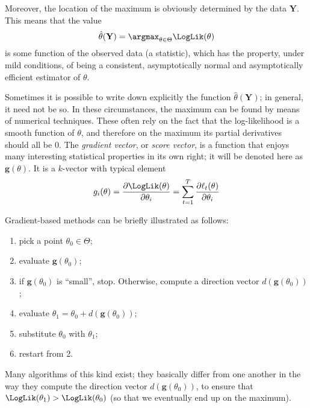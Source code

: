 Moreover, the location of the maximum is obviously determined by the
data $\mathbf{Y}$. This means that the value
\begin{equation}
  \label{eq:maxlik}
  \hat{\theta}(\mathbf{Y}) = \argmax_{\theta \in \Theta} \LogLik(\theta)
\end{equation}
is some function of the observed data (a statistic), which has the
property, under mild conditions, of being a consistent, asymptotically
normal and asymptotically efficient estimator of $\theta$.

Sometimes it is possible to write down explicitly the function
$\hat{\theta}(\mathbf{Y})$; in general, it need not be so. In these
circumstances, the maximum can be found by means of numerical
techniques. These often rely on the fact that the log-likelihood is a
smooth function of $\theta$, and therefore on the maximum its partial
derivatives should all be 0.  The \textsl{gradient vector}, or
\textsl{score vector}, is a function that enjoys many interesting
statistical properties in its own right; it will be denoted here as
$\mathbf{g}(\theta)$.  It is a $k$-vector with typical element
\[
g_i(\theta) = \frac{\partial\LogLik(\theta)}{\partial\theta_i} 
  = \sum_{t=1}^T \frac{\partial\ell_t(\theta)}{\partial\theta_i}
\]

Gradient-based methods can be briefly illustrated as follows:

\begin{enumerate}
\item pick a point $\theta_0 \in \Theta$;
\item evaluate $\mathbf{g}(\theta_0)$;
\item if $\mathbf{g}(\theta_0)$ is ``small'', stop. Otherwise, compute
  a direction vector $d(\mathbf{g}(\theta_0))$;
\item evaluate $\theta_1 = \theta_0 + d(\mathbf{g}(\theta_0))$;
\item substitute $\theta_0$ with $\theta_1$;
\item restart from 2.
\end{enumerate}

Many algorithms of this kind exist; they basically differ from one
another in the way they compute the direction vector
$d(\mathbf{g}(\theta_0))$, to ensure that $\LogLik(\theta_1) >
\LogLik(\theta_0)$ (so that we eventually end up on the maximum).

